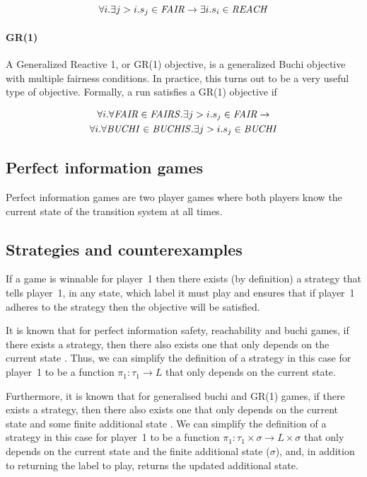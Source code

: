 \begin{equation}
\forall i. \exists j>i. s_j \in \mathit{FAIR} \rightarrow \exists i. s_i \in \mathit{REACH}
\end{equation}

\paragraph{GR(1)}
A Generalized Reactive 1, or GR(1) \cite{gr1} objective, is a generalized Buchi objective with multiple fairness conditions. In practice, this turns out to be a very useful type of objective. Formally, a run satisfies a GR(1) objective if 

\begin{multline}
\forall i. \forall \mathit{FAIR} \in \mathit{FAIRS}. \exists j>i. s_j \in \mathit{FAIR} \rightarrow \\ \forall i. \forall \mathit{BUCHI} \in \mathit{BUCHIS}. \exists j>i. s_j \in \mathit{BUCHI}
\end{multline}

\subsection{Perfect information games}

Perfect information games are two player games where both players know the current state of the transition system at all times.

\subsection{Strategies and counterexamples}

If a game is winnable for player~1 then there exists (by definition) a strategy that tells player~1, in any state, which label it must play and ensures that if player~1 adheres to the strategy then the objective will be satisfied.

It is known that for perfect information safety, reachability and buchi games, if there exists a strategy, then there also exists one that only depends on the current state \cite{something}. Thus, we can simplify the definition of a strategy in this case for player~1 to be a function $\pi_1 : \tau_1 \rightarrow L$ that only depends on the current state.

Furthermore, it is known that for generalised buchi and GR(1) games, if there exists a strategy, then there also exists one that only depends on the current state and some finite additional state \cite{something}. We can simplify the definition of a strategy in this case for player~1 to be a function $\pi_1 : \tau_1 \times \sigma \rightarrow L \times \sigma$ that only depends on the current state and the finite additional state ($\sigma$), and, in addition to returning the label to play, returns the updated additional state.

